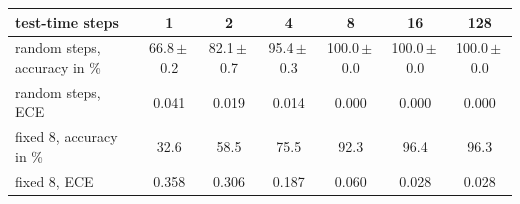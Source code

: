 \begin{tabular}{lcccccc}
\toprule
test-time steps & 1 & 2 & 4 & 8 & 16 & 128 \\
\midrule
random steps, accuracy in \% & 66.8\,$\pm$\,0.2 & 82.1\,$\pm$\,0.7 & 95.4\,$\pm$\,0.3 & 100.0\,$\pm$\,0.0 & 100.0\,$\pm$\,0.0 & 100.0\,$\pm$\,0.0 \\
random steps, ECE & 0.041 & 0.019 & 0.014 & 0.000 & 0.000 & 0.000 \\
fixed 8, accuracy in \% & 32.6 & 58.5 & 75.5 & 92.3 & 96.4 & 96.3 \\
fixed 8, ECE & 0.358 & 0.306 & 0.187 & 0.060 & 0.028 & 0.028 \\
\bottomrule
\end{tabular}
